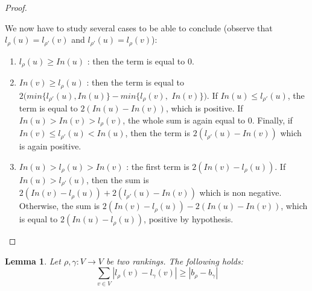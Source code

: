 \documentclass[11pt]{article}
\newtheorem{lemma}[theorem]{Lemma}
\begin{document}
\begin{proof}
\begin{enumerate}[(i)]
We now have to study several cases to be able to conclude (observe that $l_\rho(u) = l_{\rho'}(v)$ and $l_{\rho'}(u) = l_\rho(v)$):
\begin{enumerate}[(1)]
	\item $ l_\rho(u)  \geqslant In(u)$ : then the term is equal to $0$.
	\item $In(v) \geqslant  l_\rho(u)$ : then the term is equal to $2(min\{l_{\rho'}(u),In(u)\} - min\{l_\rho(v),$ $In(v)\})$. If $In(u) \leqslant l_{\rho'}(u)$, the term is equal to $2(In(u) - In(v))$, which is positive. If $In(u) > In(v) > l_\rho(v)$, the whole sum is again equal to $0$. Finally, if $In(v) \leqslant l_{\rho'}(u) < In(u)$, then the term is $2(l_{\rho'}(u) - In(v))$ which is again positive.
	\item $In(u) > l_\rho(u) > In(v)$ : the first term is $2(In(v) - l_\rho(u))$. If $In(u) > l_{\rho'}(u)$, then the sum is $2(In(v) - l_\rho(u)) + 2(l_{\rho'}(u) - In(v))$ which is non negative. Otherwise, the sum is $2(In(v) - l_\rho(u)) - 2(In(u) - In(v))$, which is equal to $2(In(u) - l_\rho(u))$, positive by hypothesis.
\end{enumerate}
\end{enumerate}
 \end{proof}

\begin{lemma}
\label{lem:approxthree}
Let $\rho, \gamma : V \rightarrow V$ be two rankings. The following holds:
$$\displaystyle{\displaystyle\sum_{v \in V}} |l_\rho(v) - l_\gamma(v)| \geqslant |b_\rho - b_\gamma|$$
\end{lemma}
\end{document}
